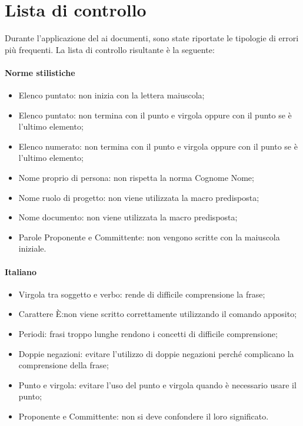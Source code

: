 \documentclass[12pt,a4paper]{article}
\begin{document}
\newpage

\appendix
\section{Lista di controllo}

Durante l’applicazione del  ai documenti, sono state riportate le tipologie di errori più frequenti. La lista di controllo risultante è la seguente:
\paragraph{Norme stilistiche}
\begin{itemize}
	\item Elenco puntato: non inizia con la lettera maiuscola;
	\item Elenco puntato: non termina con il punto e virgola oppure con il punto se è l’ultimo elemento; 
	\item Elenco numerato: non termina con il punto e virgola oppure con il punto se è l’ultimo elemento; 
	\item Nome proprio di persona: non rispetta la norma Cognome Nome;
	\item Nome ruolo di progetto: non viene utilizzata la macro predisposta;
	\item Nome documento: non viene utilizzata la macro predisposta;
	\item Parole Proponente e Committente: non vengono scritte con la maiuscola iniziale. 
\end{itemize}

\paragraph{Italiano}
\begin{itemize}
	\item Virgola tra soggetto e verbo: rende di difficile comprensione la frase;
	\item Carattere È:non viene scritto correttamente utilizzando il comando apposito;
	\item Periodi: frasi troppo lunghe rendono i concetti di difficile comprensione; 
	\item Doppie negazioni: evitare l’utilizzo di doppie negazioni perché complicano la comprensione della frase; 
	\item Punto e virgola: evitare l’uso del punto e virgola quando è necessario usare il punto; 
	\item Proponente e Committente: non si deve confondere il loro significato. 
\end{itemize}
\end{document}
